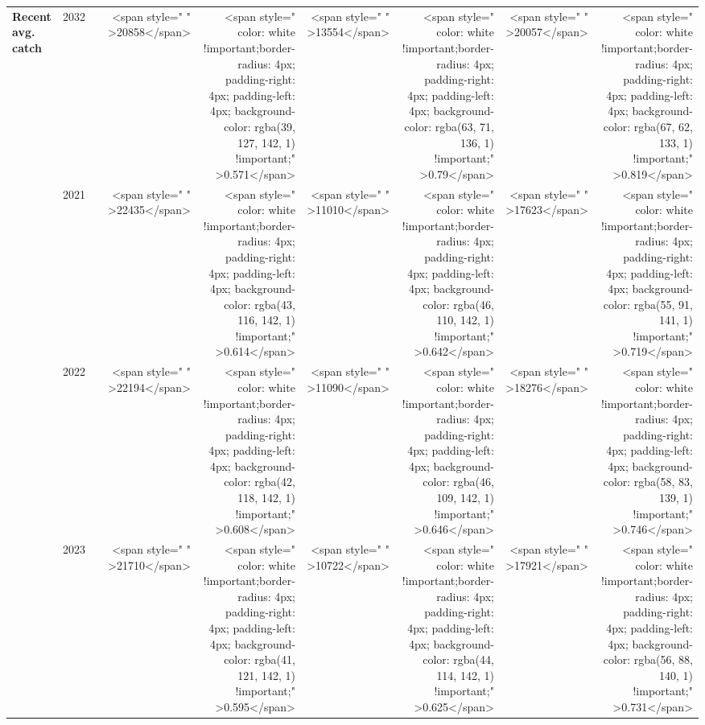 \begin{table}
\begin{tabular}[t]{>{}l|l>{}rr>{}r|rrrr}
\multirow{-12}{*}{\raggedright\arraybackslash \textbf{Recent avg. catch}} & 2032 & \cellcolor[HTML]{B0A473}{\textcolor{white}{1200}} & <span style="     " >20858</span> & <span style="     color: white !important;border-radius: 4px; padding-right: 4px; padding-left: 4px; background-color: rgba(39, 127, 142, 1) !important;" >0.571</span> & <span style="     " >13554</span> & <span style="     color: white !important;border-radius: 4px; padding-right: 4px; padding-left: 4px; background-color: rgba(63, 71, 136, 1) !important;" >0.79</span> & <span style="     " >20057</span> & <span style="     color: white !important;border-radius: 4px; padding-right: 4px; padding-left: 4px; background-color: rgba(67, 62, 133, 1) !important;" >0.819</span>\\
\cmidrule{1-9}
 & 2021 & \cellcolor[HTML]{B0A473}{\textcolor{white}{1200}} & <span style="     " >22435</span> & <span style="     color: white !important;border-radius: 4px; padding-right: 4px; padding-left: 4px; background-color: rgba(43, 116, 142, 1) !important;" >0.614</span> & <span style="     " >11010</span> & <span style="     color: white !important;border-radius: 4px; padding-right: 4px; padding-left: 4px; background-color: rgba(46, 110, 142, 1) !important;" >0.642</span> & <span style="     " >17623</span> & <span style="     color: white !important;border-radius: 4px; padding-right: 4px; padding-left: 4px; background-color: rgba(55, 91, 141, 1) !important;" >0.719</span>\\

 & 2022 & \cellcolor[HTML]{B0A473}{\textcolor{white}{1200}} & <span style="     " >22194</span> & <span style="     color: white !important;border-radius: 4px; padding-right: 4px; padding-left: 4px; background-color: rgba(42, 118, 142, 1) !important;" >0.608</span> & <span style="     " >11090</span> & <span style="     color: white !important;border-radius: 4px; padding-right: 4px; padding-left: 4px; background-color: rgba(46, 109, 142, 1) !important;" >0.646</span> & <span style="     " >18276</span> & <span style="     color: white !important;border-radius: 4px; padding-right: 4px; padding-left: 4px; background-color: rgba(58, 83, 139, 1) !important;" >0.746</span>\\

 & 2023 & \cellcolor[HTML]{60646E}{\textcolor{white}{3817}} & <span style="     " >21710</span> & <span style="     color: white !important;border-radius: 4px; padding-right: 4px; padding-left: 4px; background-color: rgba(41, 121, 142, 1) !important;" >0.595</span> & <span style="     " >10722</span> & <span style="     color: white !important;border-radius: 4px; padding-right: 4px; padding-left: 4px; background-color: rgba(44, 114, 142, 1) !important;" >0.625</span> & <span style="     " >17921</span> & <span style="     color: white !important;border-radius: 4px; padding-right: 4px; padding-left: 4px; background-color: rgba(56, 88, 140, 1) !important;" >0.731</span>\\


\end{tabular}
\end{table}
